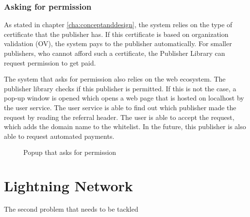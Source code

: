 \subsubsection{Asking for permission}
As stated in chapter \ref{cha:conceptanddesign}, the system relies on the type of certificate that the publisher has. If this certificate is based on organization validation (OV), the system pays to the publisher automatically. For smaller publishers, who cannot afford such a certificate, the Publisher Library can request permission to get paid. 

The system that asks for permission also relies on the web ecosystem. The publisher library checks if this publisher is permitted. If this is not the case, a pop-up window is opened which opens a web page that is hosted on localhost by the user service. The user service is able to find out which publisher made the request by reading the referral header. The user is able to accept the request, which adds the domain name to the whitelist. In the future, this publisher is also able to request automated payments.

\begin{figure}[h!]
  \setlength{\fboxsep}{0pt}%
  \caption{Popup that asks for permission}
\end{figure}

\section{Lightning Network}

The second problem that needs to be tackled 
